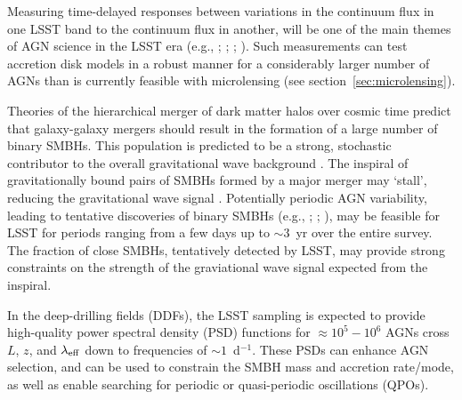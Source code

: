 Measuring time-delayed responses between variations in the continuum flux
in one LSST band to the continuum flux in another, will be one of the
main themes of AGN science in the LSST era (e.g., \citet{Chelouche2013};
\citet{CheloucheandZucker2013}; \citet{EdelsonEtal2015}; \citet{FausnaughEtal2015}).
Such measurements can test accretion disk models in a robust manner
for a considerably larger number of AGNs than is currently feasible
with microlensing (see section~\ref{sec:microlensing}).

Theories of the hierarchical merger of dark matter halos over cosmic 
time predict that galaxy-galaxy mergers should result in the formation
of a large number of binary SMBHs. This population is predicted to be a strong,
stochastic contributor to the overall gravitational wave background
\citep{2015arXiv151105564T}. The inspiral of gravitationally bound pairs of
SMBHs formed by a major merger may `stall', reducing the gravitational wave
signal \citep{2014SSRv..183..189C}. Potentially periodic AGN variability,
leading to tentative discoveries of binary SMBHs (e.g.,
\citet{2015Natur.525..351D}; \citet{GrahamEtal2015}; \citet{LiuEtal2015}),
may be feasible for LSST for periods ranging from a few
days up to $\sim3$~yr over the entire survey. The fraction of close SMBHs,
tentatively detected by LSST, may provide strong constraints on the strength
of the graviational wave signal expected from the inspiral.

In the deep-drilling fields (DDFs), the LSST sampling is expected to provide
high-quality power spectral density (PSD) functions for $\approx10^{5} - 10^{6}$
AGNs cross $L$, $z$, and $\lambda_{\rm eff}$ down to frequencies of $\sim1$~d$^{-1}$.
These PSDs can enhance AGN selection, and can be used to constrain the SMBH
mass and accretion rate/mode, as well as enable searching for periodic or
quasi-periodic oscillations (QPOs).
%
%



